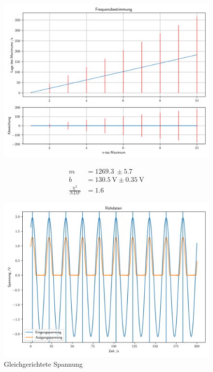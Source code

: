 \documentclass[12pt,twoside,a4paper]{scrartcl}
\begin{document}
			\begin{figure}[H]
				\begin{minipage}{0.69 \textwidth}
					\includegraphics[width =  \textwidth]{Plots/rectifier/FreqBest}
				\end{minipage}
				\begin{minipage}{0.29 \textwidth}
					\begin{align*}
						m &= \SI{1269.3}{} \pm \SI{5.7}{} \\
						b &= \SI{130.5}{ \volt } \pm \SI{0.35}{\volt} \\
						\frac{\chi^2}{NDF} &= 1.6
					\end{align*}
				\end{minipage}
			\end{figure}

			\begin{figure}[H]
                \centering
                \includegraphics[width = 0.8 \textwidth]{Plots/rectifier/Rohdaten}

                \caption{Gleichgerichtete Spannung}
			\end{figure}
\end{document}

